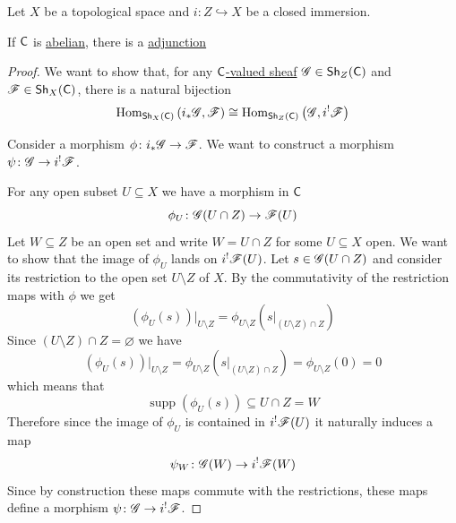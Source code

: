 \documentclass[../../main]{subfiles}
\begin{document}
\begin{theorem}\label{thm:closed-immersion-adjunction}
  Let \(X\) be a topological space and \(i\colon Z \hookrightarrow X\) be a closed immersion.

  If \(\mathsf{C}\) is \hyperref[def:abelian-category]{abelian}, there is a \hyperref[def:adjoint-functors]{adjunction}
  \begin{center}
  \end{center}
\end{theorem}
\begin{proof}
  We want to show that, for any \hyperref[def:sheaf]{\(\mathsf{C}\)-valued sheaf} \(\mathscr{G} \in \mathsf{Sh}_{Z}(\mathsf{C})\) and \(\mathscr{F} \in \mathsf{Sh}_{X}(\mathsf{C})\), there is a natural bijection
  \begin{equation*}
    \operatorname{Hom}_{\mathsf{Sh}_{X}(\mathsf{C})} \left( i_{\ast}\mathscr{G}, \mathscr{F} \right) \cong \operatorname{Hom}_{\mathsf{Sh}_{Z}(\mathsf{C})} \left( \mathscr{G}, i^{!}\mathscr{F} \right)
  \end{equation*}

  Consider a morphism \(\phi\colon i_{\ast}\mathscr{G} \to \mathscr{F}\).
  We want to construct a morphism \(\psi\colon \mathscr{G} \to i^{!}\mathscr{F}\).

  For any open subset \(U \subseteq X\) we have a morphism in \(\mathsf{C}\)
  \begin{equation*}
    \phi_{U}\colon \mathscr{G}(U \cap Z) \to \mathscr{F}(U)
  \end{equation*}
  Let \(W \subseteq Z\) be an open set and write \(W = U \cap Z\) for some \(U \subseteq X\) open.
  We want to show that the image of \(\phi_{U}\) lands on \(i^{!}\mathscr{F}(U)\).
  Let \(s \in \mathscr{G}(U \cap Z)\) and consider its restriction to the open set \(U \setminus Z\) of \(X\).
  By the commutativity of the restriction maps with \(\phi\) we get
  \begin{equation*}
    \left( \phi_{U}(s) \right)|_{U \setminus Z} = \phi_{U \setminus Z}(s|_{(U \setminus Z) \cap Z})
  \end{equation*}
  Since \((U \setminus Z) \cap Z = \varnothing\) we have
  \begin{equation*}
    \left( \phi_{U}(s) \right)|_{U \setminus Z} = \phi_{U \setminus Z}(s|_{(U \setminus Z) \cap Z}) = \phi_{U \setminus Z}(0) = 0
  \end{equation*}
  which means that
  \begin{equation*}
    \operatorname{supp} (\phi_{U}(s)) \subseteq U \cap Z = W
  \end{equation*}
  Therefore since the image of \(\phi_{U}\) is contained in \(i^{!}\mathscr{F}(U)\) it naturally induces a map
  \begin{equation*}
    \psi_{W}\colon \mathscr{G}(W) \to i^{!}\mathscr{F}(W)
  \end{equation*}
  Since by construction these maps commute with the restrictions, these maps define a morphism \(\psi\colon \mathscr{G} \to i^{!}\mathscr{F}\).


\end{proof}
\end{document}
